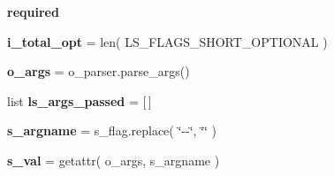 \begin{DoxyCompactItemize}
\item 
{\bfseries required}\hypertarget{namespacenegui_1_1pgdriveneestimator_ab5c3d005ba8659dc07a5f3171c7214df}{}\label{namespacenegui_1_1pgdriveneestimator_ab5c3d005ba8659dc07a5f3171c7214df}

\item 
{\bfseries i\+\_\+total\+\_\+opt} = len( L\+S\+\_\+\+F\+L\+A\+G\+S\+\_\+\+S\+H\+O\+R\+T\+\_\+\+O\+P\+T\+I\+O\+N\+AL )\hypertarget{namespacenegui_1_1pgdriveneestimator_a3c6b1b9d9500e05eca62433ac13c8692}{}\label{namespacenegui_1_1pgdriveneestimator_a3c6b1b9d9500e05eca62433ac13c8692}

\item 
{\bfseries o\+\_\+args} = o\+\_\+parser.\+parse\+\_\+args()\hypertarget{namespacenegui_1_1pgdriveneestimator_abff5b751b69197ab0c78f53cf34e3a05}{}\label{namespacenegui_1_1pgdriveneestimator_abff5b751b69197ab0c78f53cf34e3a05}

\item 
list {\bfseries ls\+\_\+args\+\_\+passed} = \mbox{[}$\,$\mbox{]}\hypertarget{namespacenegui_1_1pgdriveneestimator_af517e995e63706b0e5297adb3a372e43}{}\label{namespacenegui_1_1pgdriveneestimator_af517e995e63706b0e5297adb3a372e43}

\item 
{\bfseries s\+\_\+argname} = s\+\_\+flag.\+replace( \char`\"{}-\/-\/\char`\"{}, \char`\"{}\char`\"{} )\hypertarget{namespacenegui_1_1pgdriveneestimator_af8fac37bc1806ab9f054b8c4754e669e}{}\label{namespacenegui_1_1pgdriveneestimator_af8fac37bc1806ab9f054b8c4754e669e}

\item 
{\bfseries s\+\_\+val} = getattr( o\+\_\+args, s\+\_\+argname )\hypertarget{namespacenegui_1_1pgdriveneestimator_a801907b0dbfc713d2a817781f2b3c7d4}{}\label{namespacenegui_1_1pgdriveneestimator_a801907b0dbfc713d2a817781f2b3c7d4}

\end{DoxyCompactItemize}


